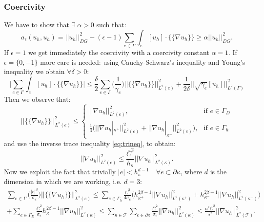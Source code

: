 \documentclass[12pt, a4paper]{article}
\theoremstyle{definition}
\theoremstyle{plain}
\theoremstyle{plain}
\theoremstyle{definition}
\begin{document}
\subsubsection{Coercivity}
We have to show that $\exists \; \alpha > 0 $ such that:
\begin{equation*}
a_\epsilon(u_h, u_h) = |\!|u_h|\!|^2_{DG} + (\epsilon - 1) \sum_{e \in \Gamma} \int_e [u_h] \cdot \{\!\!\{ \nabla u_h \}\!\!\} \geq \alpha |\!|u_h|\!|^2_{DG}.
\end{equation*}
If $\epsilon = 1$ we get immediately the coercivity with a coercivity constant $\alpha = 1$.
If $\epsilon = \{0,-1\}$ more care is needed: using Cauchy-Schwarz's inequality 
and Young's inequality we obtain $\forall \delta > 0$:
\begin{equation} \label{pas:young}
\bigg| \sum_{e \in \Gamma} \int_e [u_h] \cdot \{\!\!\{ \nabla u_h \}\!\!\} \bigg| \leq
\frac{\delta}{2} \sum_{e \in \Gamma} \bigg( \frac{1}{\gamma_e} \bigg)  \big|\!\big| \{\!\!\{ \nabla u_h \}\!\!\} \big|\!\big|^2_{L^2(e)}
+ \frac{1}{2\delta} \bigg|\!\bigg| \sqrt{\gamma_e} [u_h] \bigg|\!\bigg|^2_{L^2(\Gamma)}
\end{equation}
Then we observe that:
\begin{equation*}
\big|\!\big| \{\!\!\{ \nabla u_h \}\!\!\} \big|\!\big|^2_{L^2(e)} \leq
\begin{cases}
\big|\!\big| \nabla u_h \big|\!\big|^2_{L^2(e)}, & \text{if } e \in \Gamma_D\\
\frac{1}{4} \big( \big|\!\big| \nabla u_h|_{\kappa^+} \big|\!\big|^2_{L^2(e)} + \big|\!\big| \nabla u_h|_{\kappa^-} \big|\!\big|^2_{L^2(e)} \big), & \text{if } e \in \Gamma_h
\end{cases}
\end{equation*}
and use the inverse trace inequality \eqref{eq:trineq}, to obtain:
\begin{equation*}
\big|\!\big| \nabla u_h \big|\!\big|^2_{L^2(e)} \leq \frac{\bar{C}^2}{h_\kappa} \big|\!\big| \nabla u_h \big|\!\big|^2_{L^2(\kappa)}.
\end{equation*}
Now we exploit the fact that trivially $|e| < h_\kappa^{d-1} \quad \forall e 
\subset \partial \kappa$, where $d$ is the dimension in which we are working, 
i.e. $d = 3$:
\begin{multline} \label{pas:invineq}
\sum_{e \in \Gamma} \bigg( \frac{|e|^\beta}{\sigma_e} \bigg)  \big|\!\big| \{\!\!\{ \nabla u_h \}\!\!\} \big|\!\big|^2_{L^2(e)}
\leq \sum_{e \in \Gamma_h} \frac{\bar{C}^2}{4\sigma_e} \bigg( h_{\kappa^+}^{2\beta - 1} \big|\!\big| \nabla u_h \big|\!\big|^2_{L^2(\kappa^+)} + h_{\kappa^-}^{2\beta - 1} \big|\!\big| \nabla u_h \big|\!\big|^2_{L^2(\kappa^-)} \bigg)\\
+ \sum_{e \in \Gamma_D} \frac{\bar{C}^2}{\sigma_e} h_\kappa^{2\beta - 1} \big|\!\big| \nabla u_h \big|\!\big|^2_{L^2(\kappa)}
\leq \sum_{\kappa \in \mathcal{T}} \sum_{e \in \partial \kappa} \frac{\bar{C}^2}{\sigma_e} \big|\!\big| \nabla u_h \big|\!\big|^2_{L^2(\kappa)}
\leq \frac{n^*\bar{C}^2}{\sigma^*} \big|\!\big| \nabla u_h \big|\!\big|^2_{L^2(\mathcal{T})}.
\end{multline}
\end{document}
